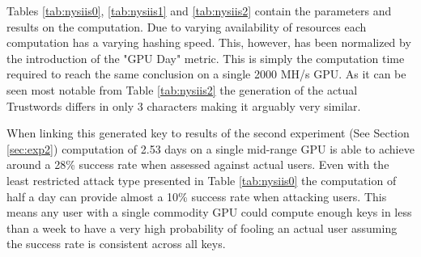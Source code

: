 Tables \ref{tab:nysiis0}, \ref{tab:nysiis1} and \ref{tab:nysiis2} contain the parameters and results on the computation. Due to varying availability of resources each computation has a varying hashing speed. This, however, has been normalized by the introduction of the "GPU Day" metric. This is simply the computation time required to reach the same conclusion on a single 2000 MH/s GPU. As it can be seen most notable from Table \ref{tab:nysiis2} the generation of the actual Trustwords differs in only 3 characters making it arguably very similar. 

When linking this generated key to results of the second experiment (See Section \ref{sec:exp2}) computation of 2.53 days on a single mid-range GPU is able to achieve around a 28\% success rate when assessed against actual users. Even with the least restricted attack type presented in Table \ref{tab:nysiis0} the computation of half a day can provide almost a 10\% success rate when attacking users. This means any user with a single commodity GPU could compute enough keys in less than a week to have a very high probability of fooling an actual user assuming the success rate is consistent across all keys.
